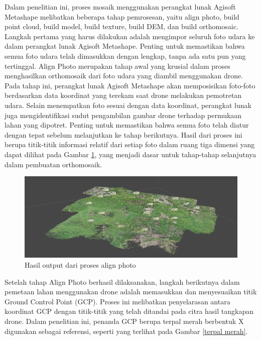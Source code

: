 \par Dalam penelitian ini, proses mosaik menggunakan perangkat lunak Agisoft Metashape melibatkan beberapa tahap pemrosesan, yaitu align photo, build point cloud, build model, build texture, build DEM, dan build orthomosaic. Langkah pertama yang harus dilakukan adalah mengimpor seluruh foto udara ke dalam perangkat lunak Agisoft Metashape. Penting untuk memastikan bahwa semua foto udara telah dimasukkan dengan lengkap, tanpa ada satu pun yang tertinggal. Align Photo merupakan tahap awal yang krusial dalam proses menghasilkan orthomosaik dari foto udara yang diambil menggunakan drone. Pada tahap ini, perangkat lunak Agisoft Metashape akan memposisikan foto-foto berdasarkan data koordinat yang terekam saat drone melakukan pemotretan udara. Selain menempatkan foto sesuai dengan data koordinat, perangkat lunak juga mengidentifikasi sudut pengambilan gambar drone terhadap permukaan lahan yang dipotret. Penting untuk memastikan bahwa semua foto telah diatur dengan tepat sebelum melanjutkan ke tahap berikutnya. Hasil dari proses ini berupa titik-titik informasi relatif dari setiap foto dalam ruang tiga dimensi yang dapat dilihat pada Gambar \ref{tiepoint}, yang menjadi dasar untuk tahap-tahap selanjutnya dalam pembuatan orthomosaik.

\begin{figure} [H]
    \centering
    \includegraphics[width=1\linewidth]{image/Tie Point.png}
    \caption{Hasil output dari proses align photo}
    \label{tiepoint}
\end{figure}

Setelah tahap Align Photo berhasil dilaksanakan, langkah berikutnya dalam pemetaan lahan menggunakan drone adalah memasukkan dan menyesuaikan titik Ground Control Point (GCP). Proses ini melibatkan penyelarasan antara koordinat GCP dengan titik-titik yang telah ditandai pada citra hasil tangkapan drone. Dalam penelitian ini, penanda GCP berupa terpal merah berbentuk X digunakan sebagai referensi, seperti yang terlihat pada Gambar \ref{terpal merah}.

